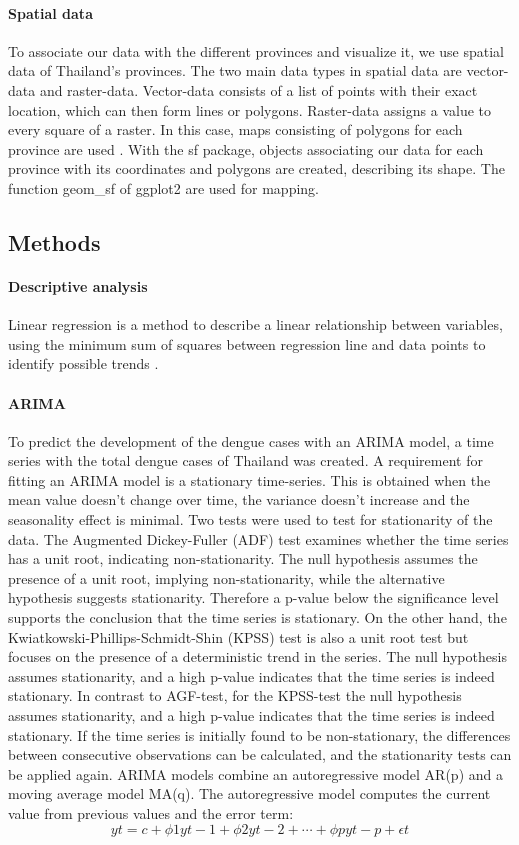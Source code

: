 	\paragraph{Spatial data}
	To associate our data with the different provinces and visualize it, we use spatial data of Thailand’s provinces. The two main data types in spatial data are vector-data and raster-data. Vector-data consists of a list of points with their exact location, which can then form lines or polygons. Raster-data assigns a value to every square of a raster. In this case, maps consisting of polygons for each province are used \citep{sds}. With the sf package, objects associating our data for each province with its coordinates and polygons are created, describing its shape. The function geom\_sf of ggplot2 are used for mapping. 
	
	\subsection{Methods}
	
	\paragraph{Descriptive analysis}
	Linear regression is a method to describe a linear relationship between variables, using the minimum sum of squares between regression line and data points to identify possible trends \citep{Schneider2010}. 


	\paragraph{ARIMA}
	
	To predict the development of the dengue cases with an ARIMA model, a time series with the total dengue cases of Thailand was created. 
	A requirement for fitting an ARIMA model is a stationary time-series. This is obtained when the mean value doesn’t change over time, the variance doesn’t increase and the seasonality effect is minimal. Two tests were used to test for stationarity of the data. The Augmented Dickey-Fuller (ADF) test examines whether the time series has a unit root, indicating non-stationarity. The null hypothesis assumes the presence of a unit root, implying non-stationarity, while the alternative hypothesis suggests stationarity. Therefore a p-value below the significance level supports the conclusion that the time series is stationary. On the other hand, the Kwiatkowski-Phillips-Schmidt-Shin (KPSS) test is also a unit root test but focuses on the presence of a deterministic trend in the series. The null hypothesis assumes stationarity, and a high p-value indicates that the time series is indeed stationary. In contrast to AGF-test, for the KPSS-test the null hypothesis assumes stationarity, and a high p-value indicates that the time series is indeed stationary. If the time series is initially found to be non-stationary, the differences between consecutive observations can be calculated, and the stationarity tests can be applied again. 
	ARIMA models combine an autoregressive model AR(p) and a moving average model MA(q). 
	The autoregressive model computes the current value from previous values and the error term:
	$$yt=c+\phi 1yt−1+\phi 2yt−2+⋯+\phi pyt−p+\epsilon t$$
	
